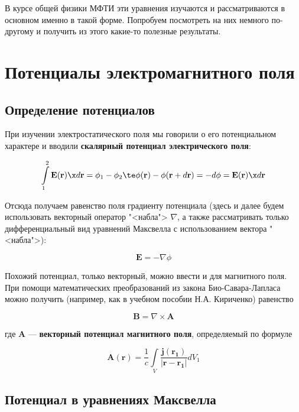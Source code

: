 \documentclass[12pt]{kiarticle}
\begin{document}
В курсе общей физики МФТИ эти уравнения изучаются и рассматриваются в основном именно в такой форме. Попробуем посмотреть на них немного по-другому и получить из этого какие-то полезные результаты. 


\section{Потенциалы электромагнитного поля}

\subsection{Определение потенциалов}

При изучении электростатического поля мы говорили о его потенциальном характере и вводили \textbf{скалярный потенциал электрического поля}:

\[ 
\int\limits_1^2 \mathbf{E(r)} \x d\mathbf{r} = \phi_1 - \phi_2 \te \phi(\mathbf{r}) - \phi(\textbf{r} + d\mathbf{r}) = -d\phi = \mathbf{E(r)} \x d\mathbf{r}
 \]

Отсюда получаем равенство поля градиенту потенциала (здесь и далее будем использовать векторный оператор "<набла"> $ \nabla $, а также рассматривать только дифференциальный вид уравнений Максвелла с использованием вектора "<набла">):

\begin{equation}\label{phi}
\mathbf{E} = - \nabla \phi 
\end{equation}

Похожий потенциал, только векторный, можно ввести и для магнитного поля. При помощи математических преобразований из закона Био-Савара-Лапласа можно получить (например, как в учебном пособии Н.А. Кириченко) равенство 

\begin{equation}\label{A}
\mathbf{B} = \nabla \times \mathbf{A}
\end{equation}

где $ \mathbf{A} $ --- \textbf{векторный потенциал магнитного поля}, определяемый по формуле

\begin{equation}\label{A_def}
\mathbf{A}(\mathbf{r}) = \dfrac{1}{c} \int\limits_V \dfrac{\mathbf{j}(\mathbf{r_1})}{|\mathbf{r} - \mathbf{r_1}|} dV_1
\end{equation}

\subsection{Потенциал в уравнениях Максвелла} \label{pot_th}
\end{document}
